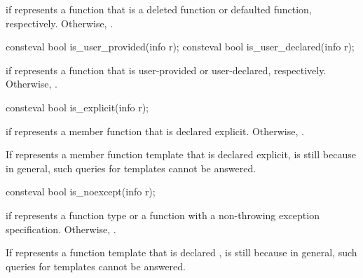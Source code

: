 \begin{itemdescr}
\pnum
\returns
{} if  represents a function that is
a deleted function
or defaulted function, respectively.
Otherwise, .
\end{itemdescr}

%
%
\begin{itemdecl}
consteval bool is_user_provided(info r);
consteval bool is_user_declared(info r);
\end{itemdecl}

\begin{itemdescr}
\pnum
\returns
{} if  represents a function that is
user-provided or user-declared, respectively.
Otherwise, .
\end{itemdescr}

%
\begin{itemdecl}
consteval bool is_explicit(info r);
\end{itemdecl}

\begin{itemdescr}
\pnum
\returns
{} if  represents a member function that is declared explicit.
Otherwise, .
\begin{note}
If  represents a member function template that is declared explicit,
 is still 
because in general,
such queries for templates cannot be answered.
\end{note}
\end{itemdescr}

%
\begin{itemdecl}
consteval bool is_noexcept(info r);
\end{itemdecl}

\begin{itemdescr}
\pnum
\returns
{} if  represents a  function type
or a function with a non-throwing exception specification.
Otherwise, .
\begin{note}
If  represents a function template that is declared ,
 is still 
because in general,
such queries for templates cannot be answered.
\end{note}
\end{itemdescr}

